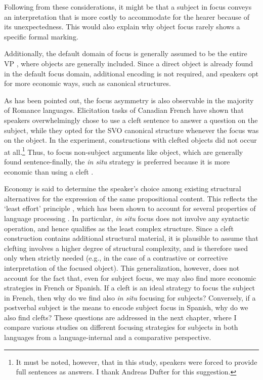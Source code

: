 Following from these considerations, it might be that a subject in focus conveys an interpretation that is more costly to accommodate for the hearer because of its  unexpectedness. This would also explain why object focus rarely shows a specific formal marking. 

Additionally, the default domain of focus is generally assumed  to be the entire VP \parencite{drubig2003toward}, where objects are generally included. Since a direct object is already found in the default focus domain, additional encoding is not required, and speakers opt for more economic ways, such as canonical structures. 

As has been pointed out, the focus asymmetry is also observable in the majority of Romance languages. Elicitation tasks of Canadian French \parencite{skopeteas2010focus} have shown that speakers overwhelmingly chose to use a cleft sentence to answer a question on the subject, while they opted for the SVO canonical structure whenever the focus was on the object. In the experiment, constructions with clefted objects did not occur at all.\footnote{It must be noted, however, that in this study, speakers were forced to provide full sentences as answers. I thank Andreas Dufter for this suggestion.} 
Thus, to focus non-subject arguments like object, which are generally found sentence-finally, the \textit{in situ} strategy is preferred because it is more economic than using a cleft \parencite{destruel2012french}. 

Economy is said to determine the speaker’s choice among existing structural alternatives for the expression of the same propositional content. This reflects the ‘least effort’ principle \parencite{zipf1949human}, which has been shown to account for several properties of language processing \parencite{skopeteas2010focus, SkopeteasFanselow2011}.
In particular, \textit{in situ} focus does not involve any syntactic operation, and hence qualifies as the least complex structure. Since a cleft construction contains additional structural material, it is plausible to assume that clefting involves a higher degree of structural complexity, and is therefore used only when strictly needed (e.g., in the case of a contrastive or corrective interpretation of the focused object). This generalization, however, does not account for the fact that, even for subject focus, we may also find more economic strategies in French or Spanish. If a cleft is an ideal strategy to focus the subject in French, then why do we find also \textit{in situ} focusing for subjects? Conversely, if a postverbal subject is the means to encode subject focus in Spanish, why do we also find clefts? 
These questions are addressed in the next chapter, where I compare various studies on different focusing strategies for subjects in both languages from a language-internal and a comparative perspective.


